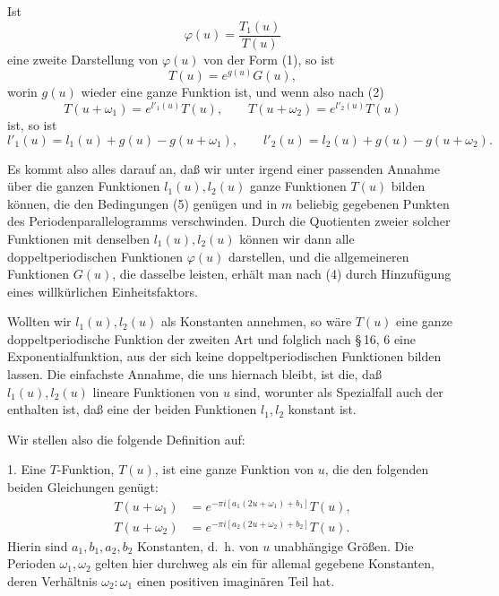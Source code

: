 \documentclass[11pt]{article}
\begin{document}
Ist
\begin{equation}
\varphi(u)=\frac{T_1(u)}{T(u)}
\tag{3}
\end{equation}
eine zweite Darstellung von $\varphi(u)$ von der Form (1), so ist
\begin{equation}
T(u)=e^{g(u)}G(u),
\tag{4}
\end{equation}
worin $g(u)$ wieder eine ganze Funktion ist, und wenn also nach (2)
\begin{equation}
T(u+\omega_1)=e^{l'_1(u)}T(u),\qquad
T(u+\omega_2)=e^{l'_2(u)}T(u)
\tag{5}
\end{equation}
ist, so ist
\[
l'_1(u)=l_1(u)+g(u)-g(u+\omega_1),\qquad
l'_2(u)=l_2(u)+g(u)-g(u+\omega_2).
\]

Es kommt also alles darauf an, daß wir unter irgend einer passenden Annahme über die ganzen Funktionen $l_1(u),l_2(u)$ ganze Funktionen $T(u)$ bilden können, die den Bedingungen (5) genügen und in $m$ beliebig gegebenen Punkten des Periodenparallelogramms verschwinden. Durch die Quotienten zweier solcher Funktionen mit denselben $l_1(u),l_2(u)$ können wir dann alle doppeltperiodischen Funktionen $\varphi(u)$ darstellen, und die allgemeineren Funktionen $G(u)$, die dasselbe leisten, erhält man nach (4) durch Hinzufügung eines willkürlichen Einheitsfaktors.

Wollten wir $l_1(u),l_2(u)$ als Konstanten annehmen, so wäre $T(u)$ eine ganze doppeltperiodische Funktion der zweiten Art und folglich nach \S\,16, 6 eine Exponentialfunktion, aus der sich keine doppeltperiodischen Funktionen bilden lassen. Die einfachste Annahme, die uns hiernach bleibt, ist die, daß $l_1(u),l_2(u)$ lineare Funktionen von $u$ sind, worunter als Spezialfall auch der enthalten ist, daß eine der beiden Funktionen $l_1,l_2$ konstant ist.

Wir stellen also die folgende Definition auf:

1. Eine $T$-Funktion, $T(u)$, ist eine ganze Funktion von $u$, die den folgenden beiden Gleichungen genügt:
\begin{equation}
\begin{aligned}
T(u+\omega_1)&=e^{-\pi i[a_1(2u+\omega_1)+b_1]}T(u),\\
T(u+\omega_2)&=e^{-\pi i[a_2(2u+\omega_2)+b_2]}T(u).
\end{aligned}
\tag{6}
\end{equation}
Hierin sind $a_1,b_1,a_2,b_2$ Konstanten, d.\ h. von $u$ unabhängige Größen. Die Perioden $\omega_1,\omega_2$ gelten hier durchweg als ein für allemal gegebene Konstanten, deren Verhältnis $\omega_2:\omega_1$ einen positiven imaginären Teil hat.
\end{document}
